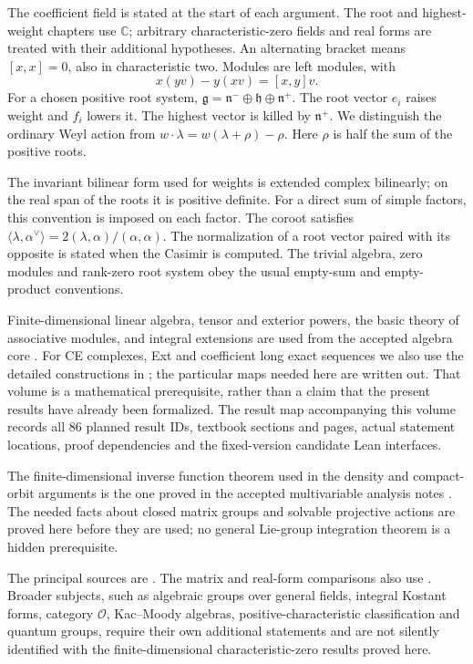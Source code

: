 \documentclass[11pt,oneside,openany]{book}
\theoremstyle{definition}
\theoremstyle{remark}
\begin{document}
The coefficient field is stated at the start of each argument.
The root and highest-weight chapters use \(\mathbb C\); arbitrary
characteristic-zero fields and real forms are treated with their
additional hypotheses. An alternating bracket means \([x,x]=0\), also
in characteristic two. Modules are left modules, with
\[
 x(yv)-y(xv)=[x,y]v.
\]
For a chosen positive root system,
\(\mathfrak g=\mathfrak n^-\oplus\mathfrak h\oplus\mathfrak n^+\).
The root vector \(e_i\) raises weight and \(f_i\) lowers it.
The highest vector is killed by \(\mathfrak n^+\).
We distinguish the ordinary Weyl action from
\(w\mathbin{\cdot}\lambda=w(\lambda+\rho)-\rho\).
Here \(\rho\) is half the sum of the positive roots.

The invariant bilinear form used for weights is extended complex
bilinearly; on the real span of the roots it is positive definite.
For a direct sum of simple factors, this convention is imposed on
each factor. The coroot satisfies
\(\langle\lambda,\alpha^\vee\rangle
=2(\lambda,\alpha)/(\alpha,\alpha)\).
The normalization of a root vector paired with its opposite is stated
when the Casimir is computed. The trivial algebra, zero modules and
rank-zero root system obey the usual empty-sum and empty-product
conventions.

Finite-dimensional linear algebra, tensor and exterior powers, the
basic theory of associative modules, and integral extensions are used
from the accepted algebra core \cite{p103}. For CE complexes, Ext and
coefficient long exact sequences we also use the detailed constructions
in \cite[Chapter 6]{homological}; the particular maps needed here are
written out. That volume is a mathematical prerequisite, rather than
a claim that the present results have already been formalized.
The result map accompanying this volume records all 86 planned result
IDs, textbook sections and pages, actual statement locations, proof
dependencies and the fixed-version candidate Lean interfaces.

The finite-dimensional inverse function theorem used in the density
and compact-orbit arguments is the one proved in the accepted
multivariable analysis notes \cite{multivariable}.
The needed facts about closed matrix groups and solvable projective
actions are proved here before they are used; no general Lie-group
integration theorem is a hidden prerequisite.

The principal sources are \cite{humphreys,etingof,weibel}.
The matrix and real-form comparisons also use \cite{hall,knapp}.
Broader subjects, such as algebraic groups over general fields,
integral Kostant forms, category \(\mathcal O\), Kac--Moody algebras,
positive-characteristic classification and quantum groups, require
their own additional statements and are not silently identified with
the finite-dimensional characteristic-zero results proved here.
\end{document}
